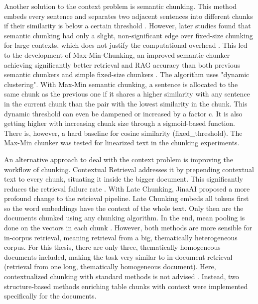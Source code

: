 \documentclass[12pt]{article} %
\begin{document}
Another solution to the context problem is semantic chunking. This method embeds every sentence and separates two adjacent sentences into different chunks if their similarity is below a certain threshold \parencite{kamradt2024fivelevels}. However, later studies found that semantic chunking had only a slight, non-significant edge over fixed-size chunking for large contexts, which does not justify the computational overhead \parencite{qu2025semantic,bennani2026systematic}. This led to the development of Max-Min-Chunking, an improved semantic chunker achieving significantly better retrieval and RAG accuracy than both previous semantic chunkers and simple fixed-size chunkers \parencite{kiss2025maxmin}. The algorithm uses "dynamic clustering". With Max-Min semantic chunking, a sentence is allocated to the same chunk as the previous one if it shares a higher similarity with any sentence in the current chunk than the pair with the lowest similarity in the chunk. This dynamic threshold can even be dampened or increased by a factor c. It is also getting higher with increasing chunk size through a sigmoid-based function. There is, however, a hard baseline for cosine similarity (fixed\_threshold). The Max-Min chunker was tested for linearized text in the chunking experiments.

An alternative approach to deal with the context problem is improving the workflow of chunking. Contextual Retrieval addresses it by prepending contextual text to every chunk, situating it inside the bigger document. This significantly reduces the retrieval failure rate \parencite{anthropic2024contextual}. With Late Chunking, JinaAI proposed a more profound change to the retrieval pipeline. Late Chunking embeds all tokens first so the word embeddings have the context of the whole text. Only then are the documents chunked using any chunking algorithm. In the end, mean pooling is done on the vectors in each chunk \parencite{gunther2024late}. However, both methods are more sensible for in-corpus retrieval, meaning retrieval from a big, thematically heterogeneous corpus. For this thesis, there are only three, thematically homogeneous documents included, making the task very similar to in-document retrieval (retrieval from one long, thematically homogeneous document). Here, contextualized chunking with standard methods is not advised \parencite{zhou2026beyond}. Instead, two structure-based methods enriching table chunks with context were implemented specifically for the documents.
\end{document}
